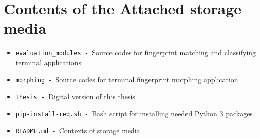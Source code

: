\chapter{Contents of the Attached storage media}
\begin{itemize}
	\item \texttt{evaluation\_modules - }Source codes for fingerprint matching and classifying terminal applications
	\item \texttt{morphing - }Source codes for terminal fingerprint morphing application
	\item \texttt{thesis - }Digital version of this thesis
	\item \texttt{pip-install-req.sh - }Bash script for installing needed Python 3 packages
	\item \texttt{README.md - }Contexts of storage media
\end{itemize}